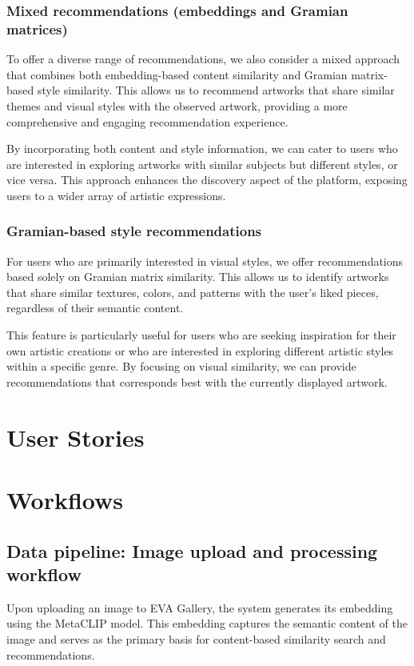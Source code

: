 \subsection{Mixed recommendations (embeddings and Gramian matrices)}
To offer a diverse range of recommendations, we also consider a mixed approach that combines both embedding-based content similarity and Gramian matrix-based style similarity. This allows us to recommend artworks that share similar themes and visual styles with the observed artwork, providing a more comprehensive and engaging recommendation experience.

By incorporating both content and style information, we can cater to users who are interested in exploring artworks with similar subjects but different styles, or vice versa. This approach enhances the discovery aspect of the platform, exposing users to a wider array of artistic expressions.

\subsection{Gramian-based style recommendations}
For users who are primarily interested in visual styles, we offer recommendations based solely on Gramian matrix similarity. This allows us to identify artworks that share similar textures, colors, and patterns with the user's liked pieces, regardless of their semantic content.

This feature is particularly useful for users who are seeking inspiration for their own artistic creations or who are interested in exploring different artistic styles within a specific genre. By focusing on visual similarity, we can provide recommendations that corresponds best with the currently displayed artwork.

\newpage

\chapter{User Stories}
\chapter{Workflows}
\section{Data pipeline: Image upload and processing workflow}

Upon uploading an image to EVA Gallery, the system generates its embedding using the MetaCLIP model. This embedding captures the semantic content of the image and serves as the primary basis for content-based similarity search and recommendations.

